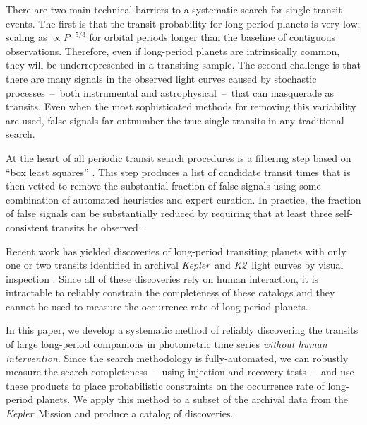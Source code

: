 \documentclass[manuscript, letterpaper]{aastex6}
\makeatletter
\let\origsection\section
\renewcommand\section{\@ifstar{\starsection}{\nostarsection}}
\newcommand\nostarsection[1]{\sectionprelude\origsection{#1}}
\newcommand\starsection[1]{\sectionprelude\origsection*{#1}}
\newcommand\sectionprelude{\vspace{1em}}
\newcommand{\project}[1]{\textsl{#1}}
\newcommand{\kepler}{\project{Kepler}}
\newcommand{\KT}{\project{K2}}
\newcommand{\bls}{\project{BLS}}
\newcommand{\paper}{paper}
\makeatother
\begin{document}
There are two main technical barriers to a systematic search for single
transit events.
The first is that the transit probability for long-period planets is very low;
scaling as $\propto P^{-5/3}$ for orbital periods longer than the
baseline of contiguous observations.
Therefore, even if long-period planets are intrinsically common, they will
be underrepresented in a transiting sample.
The second challenge is that there are many signals in the observed light
curves caused by stochastic processes~--~both instrumental and
astrophysical~--~that can masquerade as transits.
Even when the most sophisticated methods for removing this variability are
used, false signals far outnumber the true single transits in any traditional
search.

At the heart of all periodic transit search procedures is a filtering step
based on ``box least squares'' \citep[\bls;][]{Kovacs:2002}.
This step produces a list of candidate transit times that is then vetted to
remove the substantial fraction of false signals using some combination of
automated heuristics and expert curation.
In practice, the fraction of false signals can be substantially reduced by
requiring that at least three self-consistent transits be observed
\citep{Petigura:2013, Burke:2014, Rowe:2015, Coughlin:2015}.

Recent work has yielded discoveries of long-period transiting planets with
only one or two transits identified in archival \kepler\ and \KT\ light curves
by visual inspection \citep{Wang:2013, Kipping:2014a, Osborn:2016,
Kipping:2016, Uehara:2016, Wang:2015}.
Since all of these discoveries rely on human interaction, it is intractable to
reliably constrain the completeness of these catalogs and they cannot be used
to measure the occurrence rate of long-period planets.

In this \paper, we develop a systematic method of reliably discovering the
transits of large long-period companions in photometric time series
\emph{without human intervention}.
Since the search methodology is fully-automated, we can robustly measure the
search completeness~--~using injection and recovery tests~--~and use these
products to place probabilistic constraints on the occurrence rate of
long-period planets.
We apply this method to a subset of the archival data from the \kepler\
Mission and produce a catalog of discoveries.


\section{A fully-automated search method}
\end{document}
